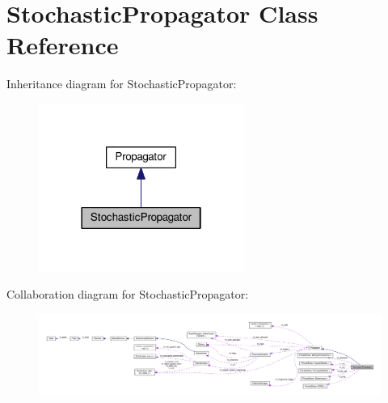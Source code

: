 \hypertarget{classStochasticPropagator}{}\section{Stochastic\+Propagator Class Reference}
\label{classStochasticPropagator}


Inheritance diagram for Stochastic\+Propagator\+:\nopagebreak
\begin{figure}[H]
\begin{center}
\leavevmode
\includegraphics[width=190pt]{classStochasticPropagator__inherit__graph}
\end{center}
\end{figure}


Collaboration diagram for Stochastic\+Propagator\+:\nopagebreak
\begin{figure}[H]
\begin{center}
\leavevmode
\includegraphics[width=350pt]{classStochasticPropagator__coll__graph}
\end{center}
\end{figure}
